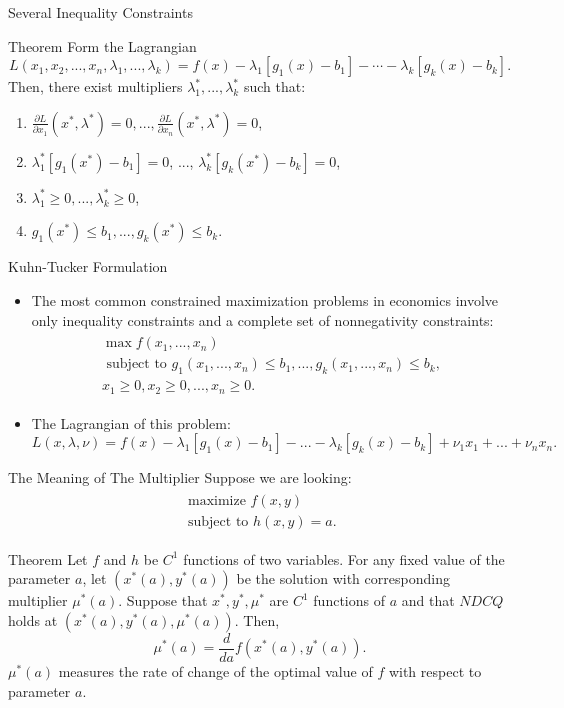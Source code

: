 \documentclass{beamer}
\begin{document}
\begin{frame}{Several Inequality Constraints}
   \begin{block}{Theorem}
   Form the Lagrangian
   \[L(x_1,x_2,..., x_n,\lambda_1,..., \lambda_k)= f(x)-\lambda_1 [g_1(x)-b_1]-\cdots -\lambda_k[g_k(x)-b_k]. 
    \]
    Then, there exist multipliers $\lambda_1^*,...,\lambda_k^*$ such that:
    \begin{enumerate}
        \item $\frac{\partial L}{\partial x_1}(x^*,  \lambda^*)=0,...,\frac{\partial L}{\partial x_n}(x^*,  \lambda^*)=0$, 
        \item $\lambda_1^*[g_1(x^*)-b_1]=0$, ..., $\lambda_k^*[g_k(x^*)-b_k]=0$,
        \item $\lambda_1^*\geq 0,..., \lambda_k^*\geq 0$,
        \item $g_1(x^*)\leq b_1,..., g_k(x^*)\leq b_k$.
    \end{enumerate}
   \end{block}
\end{frame}
\begin{frame}{Kuhn-Tucker Formulation}
    \begin{itemize}
        \item The most common constrained maximization problems in economics involve only inequality constraints and a complete set of nonnegativity constraints:
        \begin{align*}
        \begin{array}{c}
            \max f(x_1,..., x_n)\\
            \text{ subject to } g_1(x_1,..., x_n)\leq b_1,..., g_k(x_1,..., x_n)\leq b_k,\\ x_1\geq 0, x_2\geq 0,..., x_n\geq 0.
            \end{array}
        \end{align*}
    \item The Lagrangian of this problem:
    \[L(x,\lambda, \nu) =f(x)-\lambda_1[g_1(x)-b_1]-...-\lambda_k[g_k(x)-b_k]+\nu_1 x_1+...+\nu_nx_n.
    \]
    \end{itemize}
\end{frame}
\begin{frame}{The Meaning of The Multiplier}
    Suppose we are looking:
    \begin{align*}
        \begin{array}{c}
            \text{ maximize } f(x,y) \\
            \text{ subject to } h(x,y)=a.
        \end{array}
    \end{align*}
   \begin{block}{Theorem}
    Let $f$ and $h$ be $C^1$ functions of two variables. For any fixed value of the parameter $a$, let $(x^*(a), y^*(a))$ be the solution with corresponding multiplier $\mu^*(a)$. Suppose that $x^*, y^*, \mu^*$ are $C^1$ functions of $a$ and that $NDCQ$ holds at  $(x^*(a), y^*(a),\mu^*(a))$. Then,
    \[\mu^*(a)=\frac{d}{da}f(x^*(a), y^*(a)).
    \]
    $\mu^*(a)$ measures the rate of change of the optimal value of $f$ with respect to parameter $a$.
\end{block} 
\end{frame}
\end{document}
